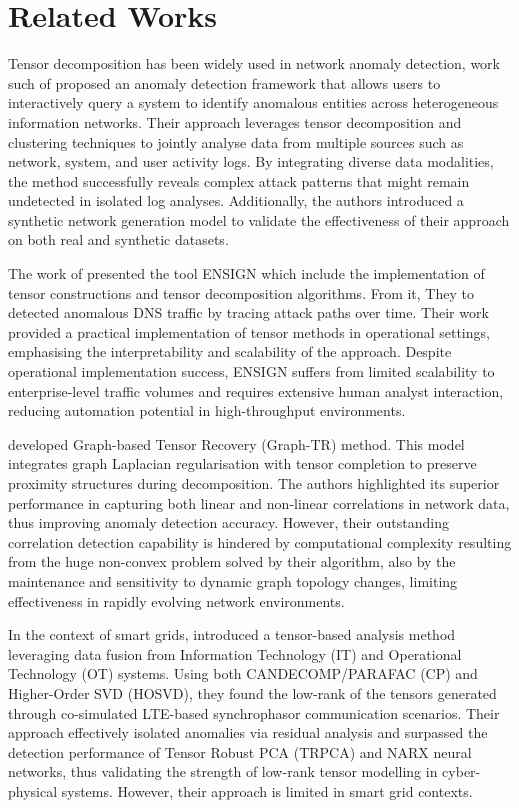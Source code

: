 \documentclass[pdflatex,sn-mathphys-num]{sn-jnl}
\theoremstyle{thmstyleone}
\theoremstyle{thmstyletwo}
\theoremstyle{thmstylethree}
\begin{document}
\section{Related Works}

Tensor decomposition has been widely used in network anomaly detection, work such of \cite{ranjbar2018qanet} proposed an anomaly detection framework that allows users to interactively query a system to identify anomalous entities across heterogeneous information networks. Their approach leverages tensor decomposition and clustering techniques to jointly analyse data from multiple sources such as network, system, and user activity logs. By integrating diverse data modalities, the method successfully reveals complex attack patterns that might remain undetected in isolated log analyses. Additionally, the authors introduced a synthetic network generation model to validate the effectiveness of their approach on both real and synthetic datasets.


The work of \cite{bruns2016ensign} presented the tool ENSIGN which include the implementation of tensor constructions and tensor decomposition algorithms. From it, They to detected anomalous DNS traffic by tracing attack paths over time. Their work provided a practical implementation of tensor methods in operational settings, emphasising the interpretability and scalability of the approach. Despite operational implementation success, ENSIGN suffers from limited scalability to enterprise-level traffic volumes and requires extensive human analyst interaction, reducing automation potential in high-throughput environments.


\cite{xie2018graph} developed Graph-based Tensor Recovery (Graph-TR) method. This model integrates graph Laplacian regularisation with tensor completion to preserve proximity structures during decomposition. The authors highlighted its superior performance in capturing both linear and non-linear correlations in network data, thus improving anomaly detection accuracy. However, their outstanding correlation detection capability is hindered by computational complexity resulting from the huge non-convex problem solved by their algorithm, also by the maintenance and sensitivity to dynamic graph topology changes, limiting effectiveness in rapidly evolving network environments.

In the context of smart grids, \cite{jafarigiv2023tensor} introduced a tensor-based analysis method leveraging data fusion from Information Technology (IT) and Operational Technology (OT) systems. Using both CANDECOMP/PARAFAC (CP) and Higher-Order SVD (HOSVD), they found the low-rank of the tensors generated through co-simulated LTE-based synchrophasor communication scenarios. Their approach effectively isolated anomalies via residual analysis and surpassed the detection performance of Tensor Robust PCA (TRPCA) and NARX neural networks, thus validating the strength of low-rank tensor modelling in cyber-physical systems. However, their approach is limited in smart grid contexts.
\end{document}
